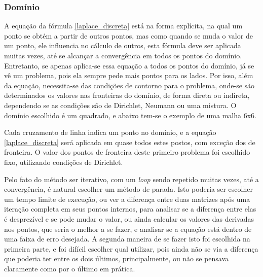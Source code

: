 \documentclass[journal]{IEEEtran}
\begin{document}
\subsubsection{Domínio}
A equação da fórmula \ref{laplace_discreta} está na forma explícita, na qual um ponto se obtém a partir de outros pontos, mas como quando se muda o valor de um ponto, ele influencia no cálculo de outros, esta fórmula deve ser aplicada muitas vezes, até se alcançar a convergência em todos os pontos do domínio. Entretanto, se apenas aplica-se essa equação a todos os pontos do domínio, já se vê um problema, pois ela sempre pede mais pontos para os lados. Por isso, além da equação, necessita-se das condições de contorno para o problema, onde-se são determinados os valores nas fronteiras do domínio, de forma direta ou indireta, dependendo se as condições são de Dirichlet, Neumann ou uma mistura. O domínio escolhido é um quadrado, e abaixo tem-se o exemplo de uma malha 6x6.


Cada cruzamento de linha indica um ponto no domínio, e a equação \ref{laplace_discreta} será aplicada em quase todos estes postos, com exceção dos de fronteira. O valor dos pontos de fronteira deste primeiro problema foi escolhido fixo, utilizando condições de Dirichlet. 

Pelo fato do método ser iterativo, com um \textit{loop} sendo repetido muitas vezes, até a convergência, é natural escolher um método de parada. Isto poderia ser escolher um tempo limite de execução, ou ver a diferença entre duas matrizes após uma iteração completa em seus pontos internos, para analisar se a diferença entre elas é desprezível e se pode mudar o valor, ou ainda calcular os valores das derivadas nos pontos, que seria o melhor a se fazer, e analisar se a equação está dentro de uma faixa de erro desejada. A segunda maneira de se fazer isto foi escolhida na primeira parte, e foi difícil escolher qual utilizar, pois ainda não se via a diferença que poderia ter entre os dois últimos, principalmente, ou não se pensava claramente como por o último em prática.
\end{document}
